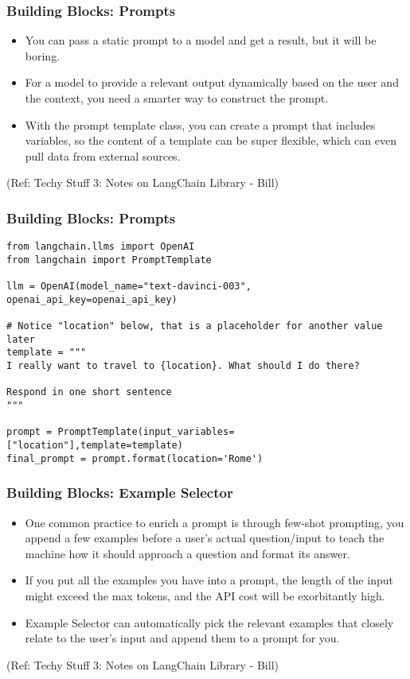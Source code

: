 \begin{frame}[fragile]\frametitle{Building Blocks: Prompts}

\begin{itemize}
\item You can pass a static prompt to a model and get a result, but it will be boring. 
\item For a model to provide a relevant output dynamically based on the user and the context, you need a smarter way to construct the prompt.
\item With the prompt template class, you can create a prompt that includes variables, so the content of a template can be super flexible, which can even pull data from external sources.
\end{itemize}

{\tiny (Ref: Techy Stuff 3: Notes on LangChain Library - Bill)}

	  
\end{frame}


\begin{frame}[fragile]\frametitle{Building Blocks: Prompts}

\begin{lstlisting}
from langchain.llms import OpenAI
from langchain import PromptTemplate

llm = OpenAI(model_name="text-davinci-003", openai_api_key=openai_api_key)

# Notice "location" below, that is a placeholder for another value later
template = """
I really want to travel to {location}. What should I do there?

Respond in one short sentence
"""

prompt = PromptTemplate(input_variables=["location"],template=template)
final_prompt = prompt.format(location='Rome')
\end{lstlisting}	  
\end{frame}

\begin{frame}[fragile]\frametitle{Building Blocks: Example Selector}

\begin{itemize}
\item One common practice to enrich a prompt is through few-shot prompting, you append a few examples before a user’s actual question/input to teach the machine how it should approach a question and format its answer.
\item If you put all the examples you have into a prompt, the length of the input might exceed the max tokens, and the API cost will be exorbitantly high.
\item Example Selector can automatically pick the relevant examples that closely relate to the user’s input and append them to a prompt for you.
\end{itemize}

{\tiny (Ref: Techy Stuff 3: Notes on LangChain Library - Bill)}

\end{frame}

